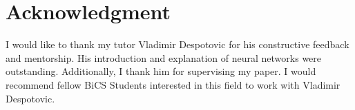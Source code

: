 
\section*{Acknowledgment}

I would like to thank my tutor Vladimir Despotovic for his constructive feedback
and mentorship. His introduction and explanation of neural networks were
outstanding. Additionally, I thank him for supervising my paper. I would
recommend fellow BiCS Students interested in this field to work with Vladimir
Despotovic.
